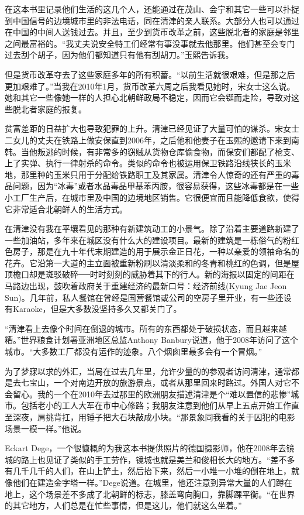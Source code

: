 在这本书里记录他们生活的这几个人，还能通过在茂山、会宁和其它一些可以扑捉到中国信号的边境城市里的非法电话，同在清津的亲人联系。大部分人也可以通过在中国的中间人送钱过去。并且，至少到货币改革之前，这些脱北者的家庭是邻里之间最富裕的。“我丈夫说安全特工们经常有事没事就去他那里。他们甚至会专门过去刮个胡子，因为他们都知道只有他有刮胡刀。”玉熙告诉我。

但是货币改革夺去了这些家庭多年的所有积蓄。“以前生活就很艰难，但是那之后更加艰难了。”当我在2010年1月，货币改革六周之后我看见她时，宋女士这么说。她和其它一些像她一样的人担心北朝鲜政局不稳定，因而它会铤而走险，导致对这些脱北者家庭的报复。

贫富差距的日益扩大也导致犯罪的上升。清津已经见证了大量可怕的谋杀。宋女士二女儿的丈夫在铁路上做安保直到2006年，之后他和他妻子在玉熙的邀请下来到南韩。当他叛逃的时候，有非常多的窃贼从货物仓库偷食物，而保安们都配了枪支、上了实弹、执行一律射杀的命令。类似的命令也被运用保卫铁路沿线狭长的玉米地，那里种的玉米只用于分配给铁路职工及其家属。清津令人惊奇的还有严重的毒品问题，因为“冰毒”或者水晶毒品甲基苯丙胺，很容易获得，这些冰毒都是在一些小工厂生产后，在城市里及中国的边境地区销售。它很便宜而且能降低食欲，使得它非常适合北朝鲜人的生活方式。

在清津没有我在平壤看见的那种有新建筑动工的小景气。除了沿着主要道路新建了一些加油站，多年来在城区没有什么大的建设项目。最新的建筑是一栋俗气的粉红色房子，那是在九十年代末期建造的用于展示金正日花，一种以亲爱的领袖命名的花卉。它沿第一大道的主立面被重新粉刷以清淡柔和的冬青和桃红的色调，但是屋顶檐口却是斑驳破碎──时时刻刻的威胁着其下的行人。新的海报以固定的间距在马路边出现，鼓吹着政府关于重建经济的最新口号：经济前线(Kyung Jae Jeon Sun)。几年前，私人餐馆在曾经是国营餐馆或公司的空房子里开业，有一些还设有Karaoke，但是大多数没坚持多久又都关门了。

“清津看上去像个时间在倒退的城市。所有的东西都处于破损状态，而且越来越糟。”世界粮食计划署亚洲地区总监Anthony Banbury说道，他于2008年访问了这个城市。“大多数工厂都没有运作的迹象。八个烟囱里最多会有一个冒烟。”

为了梦寐以求的外汇，当局在过去几年里，允许少量的的参观者访问清津，通常都是去七宝山，一个对南边开放的旅游景点，或者从那里回来时路过。外国人对它不会留心。我的一个在2010年去过那里的欧洲朋友描述清津是个“难以置信的悲惨”城市。包括老小的工人大军在市中心修路；我朋友注意到他们从早上五点开始工作直至深夜，肩挑背扛，用锤子把大石块敲成小块。“那景象同我看的关于囚犯的电影场景一模一样。”他说。

Eckart Dege，一个很慷概的为我这本书提供照片的德国摄影师，他在2008年去镜城的路上也见证了类似的手工劳作，镜城也就是美兰和俊相长大的地方。“差不多有几千几千的人们，在山上铲土，然后抬下来，然后一小堆一小堆的倒在地上，就像他们在建造金字塔一样。”Dege说道。在城里，他还注意到异常大量的人们蹲在地上，这个场景差不多成了北朝鲜的标志，膝盖弯向胸口，靠脚踝平衡。“在世界的其它地方，人们总是在忙些事情，但是这儿，他们就这么坐着。”

